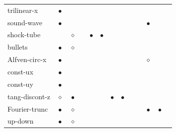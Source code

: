 \documentclass[\mydriver,12pt,twoside,notitlepage,a4paper]{article}
\newcommand{\req}{$\bullet$}
\newcommand{\opt}{$\diamond$}
\begin{document}
\begin{tabular}{@{}l|c|c|c|c|c|c|c|c|c|c|c|c}
                    & {}   & {}   & {}   & {}   & {}   \\
\midrule
   trilinear-x      & \req & {}   & {}   & {}   & {}   & {}   & {}
                    & {}   & {}   & {}   & {}   & {}   \\
\midrule
   sound-wave       & \req & {}   & {}   & {}   & {}   & {}   & {}
                    & {}   & {}   & \req & {}   & {}   \\
\midrule
   shock-tube       & {}   & \opt & {}   & \req & \req & {}   & {}
                    & {}   & {}   & {}   & {}   & {}   \\
\midrule
   bullets          & \req & \opt & {}   & {}   & {}   & {}   & {}
                    & {}   & {}   & {}   & {}   & {}   \\
\midrule
   Alfven-circ-x    & \req & {}   & {}   & {}   & {}   & {}   & {}
                    & {}   & {}   & \opt & {}   & {}   \\
\midrule
   const-ux         & \req & {}   & {}   & {}   & {}   & {}   & {}
                    & {}   & {}   & {}   & {}   & {}   \\
\midrule
   const-uy         & \req & {}   & {}   & {}   & {}   & {}   & {}
                    & {}   & {}   & {}   & {}   & {}   \\
\midrule
   tang-discont-z   & \opt & \req & {}   & {}   & {}   & \req & \req
                    & {}   & {}   & {}   & {}   & {}   \\
\midrule
   Fourier-trunc    & \req & \opt & {}   & {}   & {}   & {}   & {}
                    & {}   & {}   & \req & \req & {}   \\
\midrule
   up-down          & \req & \opt & {}   & {}   & {}   & {}   & {}
                    & {}   & {}   & {}   & {}   & {}   \\
%
\bottomrule
\end{tabular}
\end{document}
